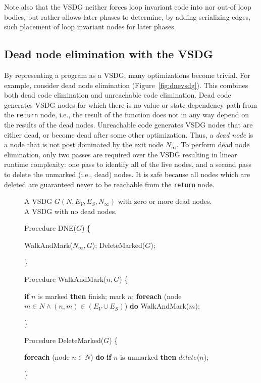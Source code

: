 {Note also that the VSDG neither forces loop invariant code into nor out-of loop bodies, but rather allows later phases to determine, by adding serializing edges, such placement of loop invariant nodes for later phases.

\subsection{Dead node elimination with the VSDG}
By representing a program as a VSDG, many optimizations become trivial. 
For example, consider dead node elimination (Figure~\ref{fig:dnevsdg}). 
This combines both dead code elimination and unreachable code elimination. 
Dead code generates VSDG nodes for which there is no value or state dependency path from the \texttt{return} node, i.e., the result of the function does not in any way depend on the results of the dead nodes. 
Unreachable code generates VSDG nodes that are either dead, or become dead after some other optimization. 
Thus, a \textit{dead node} is a node that is not post dominated by the exit node $N_{\infty}$. 
To perform dead node elimination, only two passes are required over the VSDG resulting in linear runtime complexity: 
one pass to identify all of the live nodes, and a second pass to delete the unmarked (i.e., dead) nodes. 
It is safe because all nodes which are deleted are guaranteed never to be reachable from the \texttt{return} node.

\begin{figure}[!ht]
\centering
\begin{minipage}[t]{5in}
 A VSDG $G(N,E_V,E_S,N_{\infty})$ with zero or more dead nodes.\\
 A VSDG with no dead nodes.
\setcounter{linectr}{0}

Procedure DNE($G$) \{
\begin{code}
 WalkAndMark($N_{\infty},G$);
 DeleteMarked($G$);
\end{code}
\}

\setcounter{linectr}{0}
Procedure WalkAndMark($n,G$) \{
\begin{code}
 {\bf if} $n$ is marked {\bf then} finish;
 mark $n$;
 {\bf foreach} (node $m \in N \wedge (n,m) \in (E_V \cup E_S)$) {\bf do}
    WalkAndMark($m$);
\end{code}
\}

\setcounter{linectr}{0}
Procedure DeleteMarked($G$) \{
\begin{code}
 {\bf foreach} (node $n \in N$) {\bf do}
    {\bf if} $n$ is unmarked {\bf then} $delete$($n$);
\end{code}
\}


\end{minipage}
\end{figure}}
